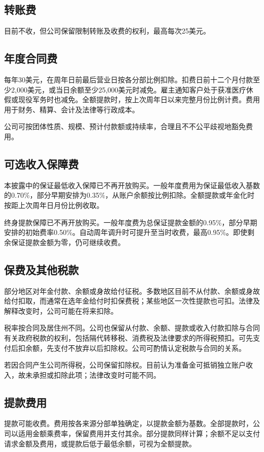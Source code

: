 \documentclass[UTF8,fontset=none,11pt,a4paper]{ctexart}
\begin{document}
\subsection*{转账费}
目前不收，但公司保留限制转账及收费的权利，最高每次25美元。


\subsection*{年度合同费}
每年30美元，在周年日前最后营业日按各分部比例扣除。扣费日前十二个月付款至少2,000美元，或当日余额至少25,000美元时减免。雇主通知客户处于获准医疗休假或现役军务时也减免。全额提款时，按上次周年日以来完整月份比例计费。费用用于财务、精算、会计及法律等行政成本。


公司可按团体性质、规模、预计付款额或持续率，合理且不不公平歧视地豁免费用。


\subsection*{可选收入保障费}
本披露中的保证最低收入保障已不再开放购买。一般年度费用为保证最低收入基数的0.70\%，部分早期安排为0.35\%，从账户余额按比例扣除。全额提款或年金化时按距上次周年日月份比例收取。


终身提款保障已不再开放购买。一般年度费为总保证提款金额的0.95\%，部分早期安排的初始费率0.50\%。自动周年调升时可提升至当时收费，最高0.95\%。即使剩余保证提款金额为零，仍可继续收费。


\subsection*{保费及其他税款}
部分地区对年金付款、余额或身故给付征税。多数地区目前不从付款、余额或身故给付扣取，而通常在选年金给付时扣保费税；某些地区一次性提款也可扣。法律及解释改变时，公司可能在将来扣除。


税率按合同及居住州不同。公司也保留从付款、余额、提款或收入付款扣除与合同有关政府税款的权利，包括隔代转移税、消费税及法律要求的所得税预扣。可先支付后扣余额，先支付不放弃以后扣除权。公司可酌情认定税款与合同的关系。


若因合同产生公司所得税，公司保留扣除权。目前认为准备金可抵销独立账户收入，故未承担或扣除此项；法律改变时可能不同。


\subsection*{提款费用}
提款可能收费。费用按各来源分部单独确定，以提款金额为基数。全部提款时，公司以适用金额乘费率，保留费用并支付其余。部分提款同样计算；余额不足以支付请求金额及费用，或提款后低于最低余额，可视为全额提款。
\end{document}
